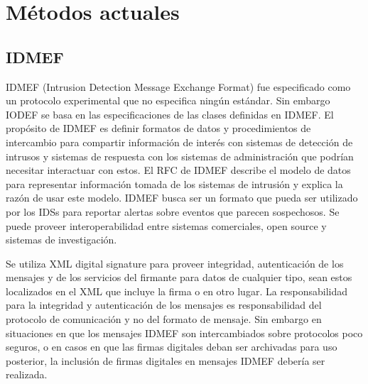 
\chapter{Métodos actuales} %



\section{IDMEF}
IDMEF (Intrusion Detection Message Exchange Format) fue especificado como un protocolo experimental que no especifica ningún 
estándar. Sin embargo IODEF se basa en las especificaciones de las clases 
definidas en IDMEF. El propósito de IDMEF es definir formatos de datos y 
procedimientos de intercambio para compartir información de interés con sistemas 
de detección de intrusos y sistemas de respuesta con los sistemas de 
administración que podrían necesitar interactuar con estos. El RFC de IDMEF 
describe el modelo de datos para representar información tomada de los sistemas 
de intrusión y explica la razón de usar este modelo. IDMEF busca ser un formato 
que pueda ser utilizado por los IDSs para reportar alertas sobre eventos que 
parecen sospechosos. Se puede proveer interoperabilidad entre sistemas 
comerciales, open source y sistemas de investigación.%


Se utiliza XML digital signature para proveer integridad, 
autenticación de los mensajes y  de los servicios del firmante para 
datos de cualquier tipo, sean estos localizados en el XML que incluye la firma o 
en otro lugar. La responsabilidad para la integridad y autenticación de  los 
mensajes es responsabilidad del protocolo de comunicación y no del formato de 
mensaje. Sin embargo en situaciones en que los mensajes IDMEF son intercambiados 
sobre protocolos poco seguros, o en casos en que las firmas digitales deban ser 
archivadas para uso posterior, la inclusión de firmas digitales en mensajes 
IDMEF debería ser realizada.

